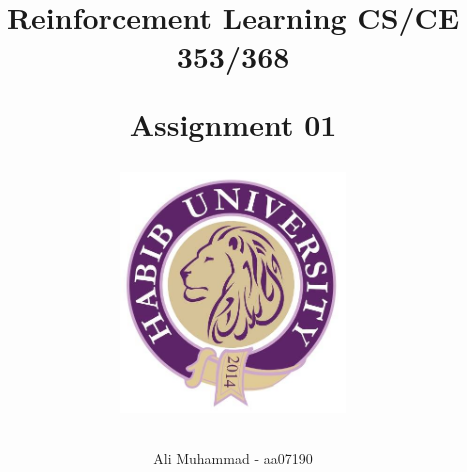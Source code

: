 \documentclass[addpoints]{exam}
\title{{\huge \textbf{Reinforcement Learning CS/CE 353/368}} 

\vspace*{1mm}
{\LARGE \textbf{Assignment 01}}

{\includegraphics[width=0.45\textwidth]{logo.png}} \\}
\author{Ali Muhammad - aa07190}
\date{}
\begin{document}
\maketitle

{\small \begin{center}
    \gradetable[h]
  \end{center}}

\newpage
\begin{questions}
\question[50]


\newpage
\question[20]


\newpage
\question[30]


% 

\end{questions}
\end{document}
